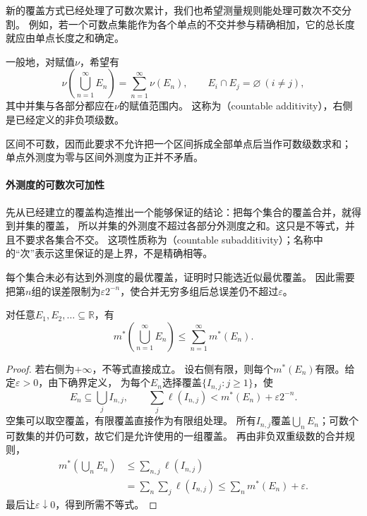 新的覆盖方式已经处理了可数次累计，我们也希望测量规则能处理可数次不交分割。
例如，若一个可数点集能作为各个单点的不交并参与精确相加，它的总长度就应由单点长度之和确定。

一般地，对赋值$\nu$，希望有
\[
 \nu\left(\bigcup_{n=1}^{\infty}E_n\right)=\sum_{n=1}^{\infty}\nu(E_n),
 \qquad E_i\cap E_j=\varnothing\ (i\neq j),
\]
其中并集与各部分都应在$\nu$的赋值范围内。
这称为（countable additivity），右侧是已经定义的非负项级数。

区间不可数，因而此要求不允许把一个区间拆成全部单点后当作可数级数求和；
单点外测度为零与区间外测度为正并不矛盾。

\paragraph{外测度的可数次可加性}

先从已经建立的覆盖构造推出一个能够保证的结论：把每个集合的覆盖合并，就得到并集的覆盖，
所以并集的外测度不超过各部分外测度之和。这只是不等式，并且不要求各集合不交。
这项性质称为（countable subadditivity）；名称中的“次”表示这里保证的是上界，不是精确相等。

每个集合未必有达到外测度的最优覆盖，证明时只能选近似最优覆盖。
因此需要把第$n$组的误差限制为$\varepsilon2^{-n}$，使合并无穷多组后总误差仍不超过$\varepsilon$。
\begin{theorem}[勒贝格外测度的可数次可加性]
\label{thm:analysis-outer-subadditivity}
对任意$E_1,E_2,\ldots\subseteq\mathbb R$，有
\begin{equation}
 m^*\left(\bigcup_{n=1}^{\infty}E_n\right)
 \leq\sum_{n=1}^{\infty}m^*(E_n).
 \label{eq:analysis-outer-subadditivity}
\end{equation}
\end{theorem}
\begin{proof}
若右侧为$+\infty$，不等式直接成立。
设右侧有限，则每个$m^*(E_n)$有限。给定$\varepsilon>0$，由下确界定义，
为每个$E_n$选择覆盖$\{I_{n,j}:j\geq1\}$，使
\[
 E_n\subseteq\bigcup_j I_{n,j},\qquad
 \sum_j\ell(I_{n,j})<m^*(E_n)+\varepsilon2^{-n}.
\]
空集可以取空覆盖，有限覆盖直接作为有限组处理。
所有$I_{n,j}$覆盖$\bigcup_nE_n$；可数个可数集的并仍可数，故它们是允许使用的一组覆盖。
再由非负双重级数的合并规则，
\[
 \begin{aligned}
 m^*\left(\bigcup_nE_n\right)
 &\leq\sum_{n,j}\ell(I_{n,j})\\
 &=\sum_n\sum_j\ell(I_{n,j})
 \leq\sum_nm^*(E_n)+\varepsilon.
 \end{aligned}
\]
最后让$\varepsilon\downarrow0$，得到所需不等式。
\end{proof}

